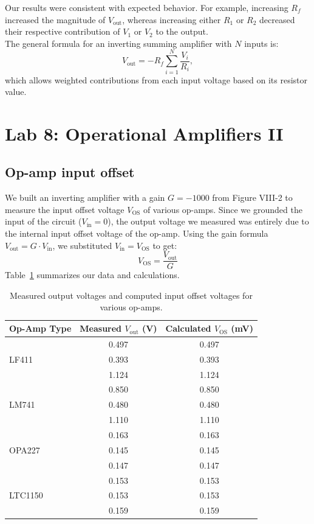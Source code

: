 \documentclass{article}
\begin{document}
\noindent Our results were consistent with expected behavior. For example,
increasing $R_f$ increased the magnitude of $V_\text{out}$, whereas increasing
either $R_1$ or $R_2$ decreased their respective contribution of $V_1$ or $V_2$
to the output.\\

\noindent The general formula for an inverting summing amplifier with $N$ inputs is:
\begin{equation}
    V_\text{out}=-R_f\sum_{i=1}^N\frac{V_i}{R_i},
\end{equation}
\noindent which allows weighted contributions from each input voltage based on
its resistor value.



\section{Lab 8: Operational Amplifiers II}

\subsection{Op-amp input offset}

We built an inverting amplifier with a gain $G=-1000$ from Figure VIII-2 
to measure the input offset voltage $V_\text{OS}$ of various op-amps. Since we
grounded the input of the circuit ($V_\text{in}=0$), the output voltage we
measured was entirely due to the internal input offset voltage of the op-amp.
Using the gain formula $V_\text{out}=G\cdot V_\text{in}$, we substituted
$V_\text{in}=V_\text{OS}$ to get:
\begin{equation}
    V_\text{OS}=\frac{V_\text{out}}{G}
\end{equation}
\noindent Table~\ref{tab:opamp_vos} summarizes our data and calculations.

\begin{table}[H]
\centering
\begin{tabular}{|l|c|c|}
    \hline
    Op-Amp Type & Measured $V_\text{out}$ (V) & Calculated $V_\text{OS}$ (mV) \\
    \hline
     & 0.497 & 0.497 \\
    LF411 & 0.393 & 0.393 \\
     & 1.124 & 1.124 \\
    \hline
     & 0.850 & 0.850 \\
    LM741 & 0.480 & 0.480 \\
     & 1.110 & 1.110 \\
    \hline
     & 0.163 & 0.163 \\
    OPA227 & 0.145 & 0.145 \\
     & 0.147 & 0.147 \\
    \hline
     & 0.153 & 0.153 \\
    LTC1150 & 0.153 & 0.153 \\
     & 0.159 & 0.159 \\
    \hline
    \end{tabular}
    \caption{Measured output voltages and computed input offset voltages for various op-amps.}
    \label{tab:opamp_vos}
\end{table}
\end{document}
